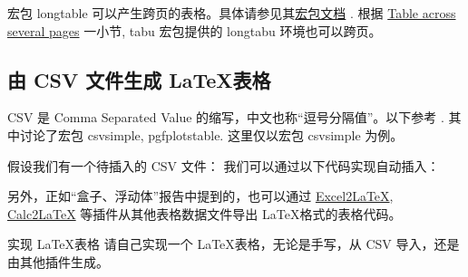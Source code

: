 宏包 longtable 可以产生跨页的表格。具体请参见其\href{http://mirrors.ctan.org/macros/latex/required/tools/longtable.pdf}{宏包文档} \cite{longtable}. 根据 \cite{wiki:tables} \href{https://en.wikibooks.org/wiki/LaTeX/Tables#The\_tabu\_environment}{Table across several pages} 一小节, tabu 宏包提供的 longtabu 环境也可以跨页。


\subsection[CSV to LaTeX tables]{由 CSV 文件生成 \LaTeX 表格}
CSV 是 Comma Separated Value 的缩写，中文也称“逗号分隔值”。以下参考 \cite{texblog-csv}. 其中讨论了宏包 csvsimple, pgfplotstable. 这里仅以宏包 csvsimple 为例。

假设我们有一个待插入的 CSV 文件：
我们可以通过以下代码实现自动插入：
\begin{sidelst}

\end{sidelst}

另外，正如“盒子、浮动体”报告中提到的，也可以通过 \href{https://github.com/krlmlr/Excel2LaTeX}{Excel2LaTeX}, \href{http://calc2latex.sourceforge.net/}{Calc2LaTeX} 等插件从其他表格数据文件导出 \LaTeX 格式的表格代码。

\begin{Ex}{实现 \LaTeX 表格}
请自己实现一个 \LaTeX 表格，无论是手写，从 CSV 导入，还是由其他插件生成。
\end{Ex}